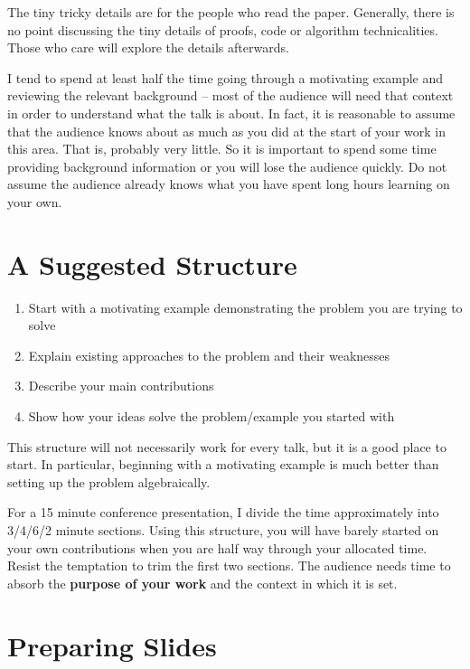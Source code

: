 \documentclass[]{book}
\providecommand{\tightlist}{%
  \setlength{\itemsep}{0pt}\setlength{\parskip}{0pt}}
\theoremstyle{definition}
\theoremstyle{definition}
\theoremstyle{definition}
\theoremstyle{remark}
\begin{document}
The tiny tricky details are for the people who read
the paper. Generally, there is no point discussing the
tiny details of proofs, code or algorithm technicalities. Those
who care will explore the details afterwards.

I tend to spend at least half the time going
through a motivating example and reviewing the
relevant background -- most of the audience will
need that context in order to understand what the
talk is about. In fact, it is reasonable to assume that
the audience knows about as much as you did at the
start of your work in this area. That is, probably very
little. So it is important to spend some time providing
background information or you will lose the audience
quickly. Do not assume the audience already knows what you have spent long hours learning on
your own.

\hypertarget{a-suggested-structure}{%
\section{A Suggested Structure}\label{a-suggested-structure}}

\begin{enumerate}
\def\labelenumi{\arabic{enumi}.}
\tightlist
\item
  Start with a motivating example demonstrating the problem you are trying to solve
\item
  Explain existing approaches to the problem and their weaknesses
\item
  Describe your main contributions
\item
  Show how your ideas solve the problem/example you started with
\end{enumerate}

This structure will not necessarily work for every
talk, but it is a good place to start. In particular, beginning
with a motivating example is much better
than setting up the problem algebraically.

For a 15 minute conference presentation, I divide
the time approximately into 3/4/6/2 minute sections.
Using this structure, you will have barely started
on your own contributions when you are half way
through your allocated time. Resist the temptation to
trim the first two sections. The audience needs time
to absorb the \textbf{purpose of your work} and the context
in which it is set.

\hypertarget{preparing-slides}{%
\section{Preparing Slides}\label{preparing-slides}}
\end{document}
